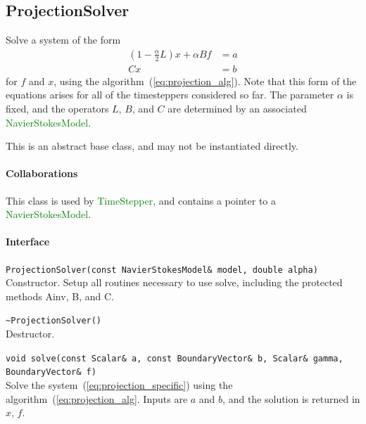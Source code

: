 \documentclass[11pt]{article}
\def\class#1{\textcolor{green}{\ttfamily\small #1}} %
\def\fn#1{{\ttfamily\small #1}} %
\let\code\lstinline
\begin{document}
\subsection{ProjectionSolver}
Solve a system of the form
\begin{equation}
\begin{aligned}
	(1 - \frac{\alpha}{2}L)x + \alpha Bf &= a\\
	Cx &= b
\end{aligned}
\label{eq:projection_specific}
\end{equation}
for $f$ and $x$, using the algorithm~(\ref{eq:projection_alg}).  Note that this form of the equations arises for all of the timesteppers considered so far.  The parameter $\alpha$ is fixed, and the operators $L$, $B$, and $C$ are determined by an associated \class{NavierStokesModel}.

This is an abstract base class, and may not be instantiated directly.

\paragraph{Collaborations}
This class is used by \class{TimeStepper}, and contains a pointer to a \class{NavierStokesModel}.

\paragraph{Interface}
\begin{description}
	\item \code|ProjectionSolver(const NavierStokesModel& model, double alpha)|\\
		Constructor.  Setup all routines necessary to use \fn{solve}, including the protected methods \fn{Ainv}, \fn{B}, and \fn{C}.
	\item \code|~ProjectionSolver()|\\
		Destructor.
	\item \code|void solve(const Scalar& a, const BoundaryVector& b, Scalar& gamma, BoundaryVector& f)|\\
	 	Solve the system~(\ref{eq:projection_specific}) using the algorithm~(\ref{eq:projection_alg}.  Inputs are $a$ and $b$, and the solution is returned in $x$, $f$.
\end{description}
\end{document}
